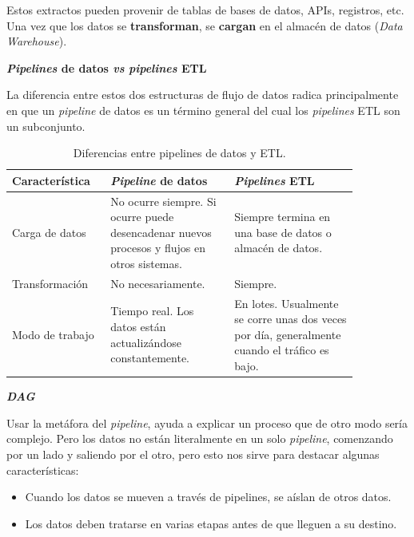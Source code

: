 \documentclass[a4paper,12pt]{article}
\begin{document}
		Estos extractos pueden provenir de tablas de bases de datos, APIs, registros, etc. Una vez que los datos se \textbf{transforman}, se \textbf{cargan} en el almacén de datos (\textit{Data Warehouse}).
						
		\textbf{\textit{Pipelines} de datos \textit{vs} \textit{pipelines} ETL}
						
		La diferencia entre estos dos estructuras de flujo de datos radica principalmente en que un \textit{pipeline} de datos es un término general del cual los \textit{pipelines} ETL son un subconjunto. \citep{Tobin2020Jun}
						
		\begin{table}[H]
			\centering
			\begin{tabular}{p{0.22\linewidth}|p{0.32\linewidth}|p{0.32\linewidth}}
				\hline
				\textbf{Característica} & \textbf{\textit{Pipeline} de datos} & \textbf{\textit{Pipelines} ETL} \\ \hline
				Carga de datos &
				No ocurre siempre. Si ocurre puede desencadenar nuevos procesos y flujos en otros sistemas. &
				Siempre termina en una base de datos o almacén de datos. \\
				Transformación          & No necesariamente.                  & Siempre.                        \\
				Modo de trabajo &
				Tiempo real. Los datos están actualizándose constantemente. &
				En lotes. Usualmente se corre unas dos veces por día, generalmente cuando el tráfico es bajo. \\ \hline
			\end{tabular}
			\caption{Diferencias entre pipelines de datos y ETL.}
			\label{tab:pipelines-table}
		\end{table}
						
		\textbf{\textit{DAG}}
						
		Usar la metáfora del \textit{pipeline}, ayuda a explicar un proceso que de otro modo sería complejo. Pero los datos no están literalmente en un solo \textit{pipeline}, comenzando por un lado y saliendo por el otro, pero esto nos sirve para destacar algunas características: \citep{astronomer}
		\begin{itemize}[noitemsep, topsep=2pt]
			\item Cuando los datos se mueven a través de pipelines, se aíslan de otros datos.
			\item Los datos deben tratarse en varias etapas antes de que lleguen a su destino.
		\end{itemize}
						
\end{document}
